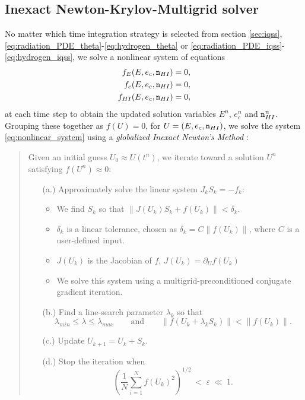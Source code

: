 \documentclass[letterpaper,10pt]{article}
\renewcommand{\(}{\left(}
\renewcommand{\)}{\right)}
\newcommand{\mn}{{\tt n}}
\begin{document}
\subsection{Inexact Newton-Krylov-Multigrid solver}
\label{sec:nkmg}
No matter which time integration strategy is selected from section
\ref{sec:iqss},
\eqref{eq:radiation_PDE_theta}-\eqref{eq:hydrogen_theta} or 
\eqref{eq:radiation_PDE_iqss}-\eqref{eq:hydrogen_iqss}, we solve a
nonlinear system of equations 
\begin{align}
  \notag
  f_E(E,e_c,\mn_{HI}) &= 0, \\
  \label{eq:nonlinear_system}
  f_e(E,e_c,\mn_{HI}) &= 0, \\
  \notag
  f_{HI}(E,e_c,\mn_{HI}) &= 0,
\end{align}
at each time step to obtain the updated solution variables $E^n$,
$e_c^n$ and $\mn_{HI}^n$.  Grouping these together as $f(U)=0$, for
$U=(E,e_c,\mn_{HI})$, we solve the system \eqref{eq:nonlinear_system}
using a {\em globalized Inexact Newton's Method}
\cite{Kelley1995,KnollKeyes2004,KeyesReynoldsWoodward2006}:
\begin{quote}
Given an initial guess $U_0\approx U(t^n)$, we iterate toward a
solution $U^n$ satisfying $f(U^n)\approx 0$:
\begin{itemize}
\item[(a.)] Approximately solve the linear system $J_k S_k = -f_k$:
\begin{itemize}
  \item We find $S_k$ so that $\|J(U_k) S_k + f(U_k)\| <
    \delta_k$. 
  \item $\delta_k$ is a linear tolerance, chosen as $\delta_k =
    C\|f(U_k)\|$, where $C$ is a user-defined input.
  \item $J(U_k)$ is the Jacobian of $f$, $J(U_k) = \partial_U f(U_k)$
  \item We solve this system using a multigrid-preconditioned
    conjugate gradient iteration.
  \end{itemize}
\item[(b.)] Find a line-search parameter $\lambda_k$ so that
  \[
    \lambda_{min} \le \lambda \le \lambda_{max}
    \qquad\text{and}\qquad \|f(U_k + \lambda_k S_k)\| < \|f(U_k)\|.
  \] 
\item[(c.)] Update $U_{k+1} = U_k + S_k$.
\item[(d.)] Stop the iteration when
  \[
    \left(\frac1N \sum_{i=1}^N f(U_k)^2 \right)^{1/2} \ < \
    \varepsilon \ \ll \ 1.
  \]
\end{itemize}
\end{quote}
\end{document}
